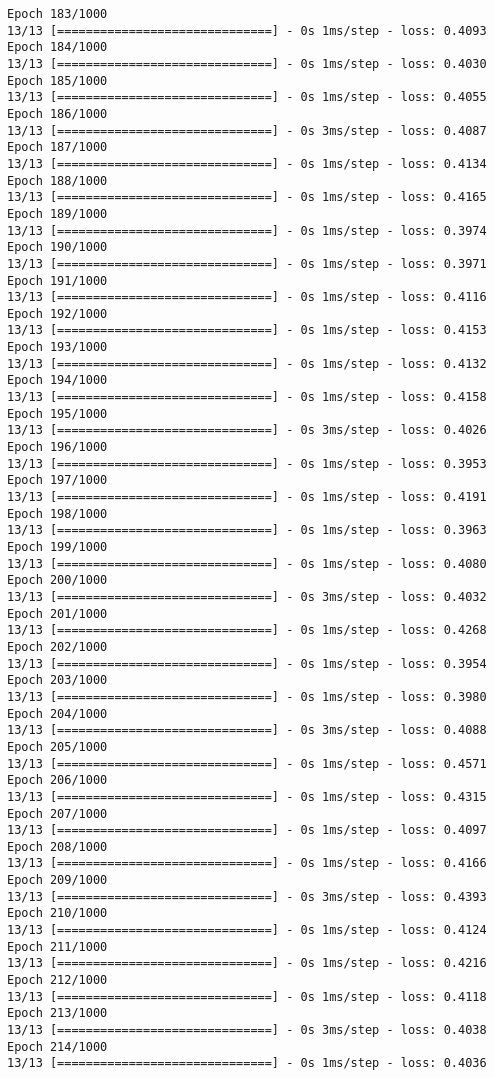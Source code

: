 \documentclass[11pt]{article}
\begin{document}
\begin{Verbatim}[commandchars=\\\{\}]
Epoch 183/1000
13/13 [==============================] - 0s 1ms/step - loss: 0.4093
Epoch 184/1000
13/13 [==============================] - 0s 1ms/step - loss: 0.4030
Epoch 185/1000
13/13 [==============================] - 0s 1ms/step - loss: 0.4055
Epoch 186/1000
13/13 [==============================] - 0s 3ms/step - loss: 0.4087
Epoch 187/1000
13/13 [==============================] - 0s 1ms/step - loss: 0.4134
Epoch 188/1000
13/13 [==============================] - 0s 1ms/step - loss: 0.4165
Epoch 189/1000
13/13 [==============================] - 0s 1ms/step - loss: 0.3974
Epoch 190/1000
13/13 [==============================] - 0s 1ms/step - loss: 0.3971
Epoch 191/1000
13/13 [==============================] - 0s 1ms/step - loss: 0.4116
Epoch 192/1000
13/13 [==============================] - 0s 1ms/step - loss: 0.4153
Epoch 193/1000
13/13 [==============================] - 0s 1ms/step - loss: 0.4132
Epoch 194/1000
13/13 [==============================] - 0s 1ms/step - loss: 0.4158
Epoch 195/1000
13/13 [==============================] - 0s 3ms/step - loss: 0.4026
Epoch 196/1000
13/13 [==============================] - 0s 1ms/step - loss: 0.3953
Epoch 197/1000
13/13 [==============================] - 0s 1ms/step - loss: 0.4191
Epoch 198/1000
13/13 [==============================] - 0s 1ms/step - loss: 0.3963
Epoch 199/1000
13/13 [==============================] - 0s 1ms/step - loss: 0.4080
Epoch 200/1000
13/13 [==============================] - 0s 3ms/step - loss: 0.4032
Epoch 201/1000
13/13 [==============================] - 0s 1ms/step - loss: 0.4268
Epoch 202/1000
13/13 [==============================] - 0s 1ms/step - loss: 0.3954
Epoch 203/1000
13/13 [==============================] - 0s 1ms/step - loss: 0.3980
Epoch 204/1000
13/13 [==============================] - 0s 3ms/step - loss: 0.4088
Epoch 205/1000
13/13 [==============================] - 0s 1ms/step - loss: 0.4571
Epoch 206/1000
13/13 [==============================] - 0s 1ms/step - loss: 0.4315
Epoch 207/1000
13/13 [==============================] - 0s 1ms/step - loss: 0.4097
Epoch 208/1000
13/13 [==============================] - 0s 1ms/step - loss: 0.4166
Epoch 209/1000
13/13 [==============================] - 0s 3ms/step - loss: 0.4393
Epoch 210/1000
13/13 [==============================] - 0s 1ms/step - loss: 0.4124
Epoch 211/1000
13/13 [==============================] - 0s 1ms/step - loss: 0.4216
Epoch 212/1000
13/13 [==============================] - 0s 1ms/step - loss: 0.4118
Epoch 213/1000
13/13 [==============================] - 0s 3ms/step - loss: 0.4038
Epoch 214/1000
13/13 [==============================] - 0s 1ms/step - loss: 0.4036

\end{Verbatim}
\end{document}
